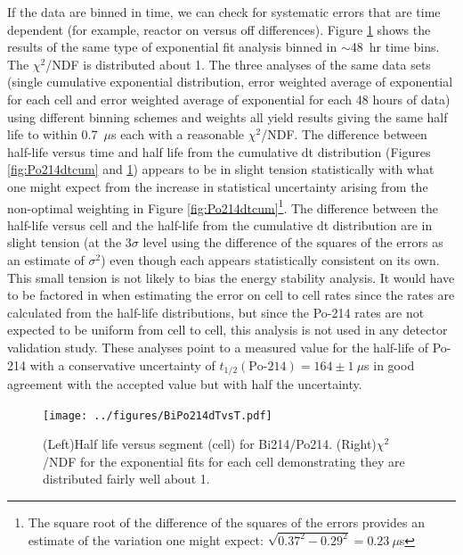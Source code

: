 If the data are binned in time, we can check for systematic errors that are time dependent (for example, reactor on versus off differences). Figure \ref{fig:Po214thalfvstime} shows the results of the same type of exponential fit analysis binned in $\sim$48~hr time bins. The $\chi^2$/NDF is distributed about 1. The three analyses of the same data sets (single cumulative exponential distribution, error weighted average of exponential for each cell and error weighted average of exponential for each 48 hours of data) using different binning schemes and weights all yield results giving the same half life to within 0.7~$\mu$s each with a reasonable $\chi^2$/NDF. The difference between half-life versus time and half life from the cumulative dt distribution (Figures \ref{fig:Po214dtcum} and \ref{fig:Po214thalfvstime}) appears to be in slight tension statistically with what one might expect from the increase in statistical uncertainty arising from the non-optimal weighting in Figure \ref{fig:Po214dtcum}\footnote{The square root of the difference of the squares of the errors provides an estimate of the variation one might expect: $\sqrt{0.37^2-0.29^2}=0.23~\mu$s}. The difference between the half-life versus cell and the half-life from the cumulative dt distribution are in slight tension (at the 3$\sigma$ level using the difference of the squares of the errors as an estimate of $\sigma^2$) even though each appears statistically consistent on its own. This small tension is not likely to bias the energy stability analysis. It would have to be factored in when estimating the error on cell to cell rates since the rates are calculated from the half-life distributions, but since the Po-214 rates are not expected to be uniform from cell to cell, this analysis is not used in any detector validation study. These analyses point to a measured value for the half-life of Po-214 with a conservative uncertainty of $t_{1/2}(\textrm{Po-214})=164\pm1~\mu$s in good agreement with the accepted value but with half the uncertainty.  

\begin{figure}[!h]
\centering
\texttt{[image: ../figures/BiPo214dTvsT.pdf]}
\caption{\label{fig:Po214thalfvstime}(Left)Half life versus segment (cell) for Bi214/Po214. (Right)$\chi^2$/NDF for the exponential fits for each cell demonstrating they are distributed fairly well about 1.}
\end{figure}

